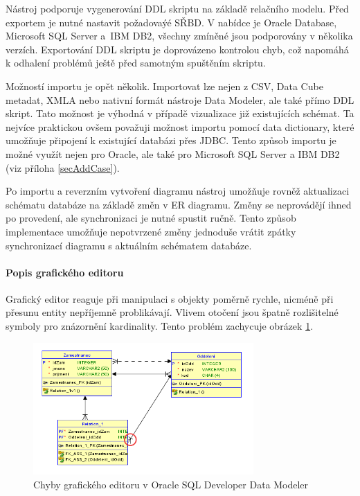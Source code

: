 \documentclass[czech,bachelor,public,dept460,male,oneside]{diploma}
\begin{document}
		Nástroj podporuje vygenerování DDL skriptu na základě relačního modelu. Před exportem je nutné nastavit požadovaýé SŘBD. V nabídce je Oracle Database, Microsoft SQL Server a~IBM DB2, všechny zmíněné jsou podporovány v několika verzích. Exportování DDL skriptu je doprovázeno kontrolou chyb, což napomáhá k odhalení problémů ještě před samotným spuštěním skriptu.
		
		Možností importu je opět několik. Importovat lze nejen z CSV, Data Cube metadat, XMLA nebo nativní formát nástroje Data Modeler, ale také přímo DDL skript. Tato možnost je výhodná v případě vizualizace již existujících schémat. Ta nejvíce praktickou ovšem považuji možnost importu pomocí data dictionary, které umožňuje připojení k existující databázi přes JDBC. Tento způsob importu je možné využít nejen pro Oracle, ale také pro Microsoft SQL Server a IBM DB2 (viz příloha \ref{secAddCase}).
		
		Po importu a reverzním vytvoření diagramu nástroj umožňuje rovněž aktualizaci schématu databáze na základě změn v ER diagramu. Změny se neprovádějí ihned po provedení, ale synchronizaci  je nutné spustit ručně. Tento způsob implementace umožňuje nepotvrzené změny jednoduše vrátit zpátky synchronizací diagramu s aktuálním schématem databáze.
		
		\paragraph{Popis grafického editoru}
		Grafický editor reaguje při manipulaci s objekty poměrně rychle, nicméně při přesunu entity nepříjemně problikávají. Vlivem otočení jsou špatně rozlišitelné symboly pro znázornění kardinality. Tento problém zachycuje obrázek \ref{fig:oracleBug}.
		
		\begin{figure}[!h]
			\centering
			\includegraphics[width=0.75\textwidth]{Figures/EditorOracleLogic}
			\caption{Chyby grafického editoru v Oracle SQL Developer Data Modeler}
			\label{fig:oracleBug}
		\end{figure}
		
\end{document}
